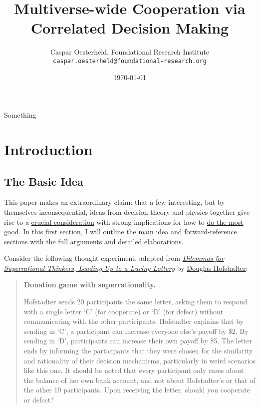 \documentclass{book}
\title{Multiverse-wide Cooperation via Correlated Decision Making}
\author {Caspar Oesterheld, Foundational Research Institute\\\texttt{caspar.oesterheld@foundational-research.org}}
\date{\today}
\begin{document}
Something
\maketitle    %



\newpage

\tableofcontents

\chapter{Introduction}
\label{Introduction}
\section{The Basic Idea}
\label{basicidea}

This paper makes an extraordinary claim: that a few interesting, but by themselves inconsequential, ideas from decision theory and physics together give rise to a \href{https://casparoesterheld.files.wordpress.com/2016/11/crucialconsiderations1.pdf}{crucial consideration} with strong implications for how to \href{https://en.wikipedia.org/wiki/Effective_altruism}{do the most good}. In this first section, I will outline the main idea and forward-reference sections with the full arguments and detailed elaborations.

Consider the following thought experiment, adapted from \href{https://www.gwern.net/docs/1985-hofstadter#dilemmas-for-superrational-thinkers-leading-up-to-a-luring-lottery}{\textit{Dilemmas for Superrational Thinkers, Leading Up to a Luring Lottery}} by \href{https://en.wikipedia.org/wiki/Douglas_Hofstadter}{Douglas Hofstadter}:

\begin{quote}
\hypertarget{donationgame}{\textbf{Donation game with superrationality.}} Hofstadter sends 20 participants the same letter, asking them to respond with a single letter ‘C’ (for cooperate) or ‘D’ (for defect) without communicating with the other participants. Hofstadter explains that by sending in ‘C’, a participant can increase everyone else’s payoff by \$2. By sending in ‘D’, participants can increase their own payoff by \$5. The letter ends by informing the participants that they were chosen for the similarity and rationality of their decision mechanisms, particularly in weird scenarios like this one. It should be noted that every participant only cares about the balance of her own bank account, and not about Hofstadter’s or that of the other 19 participants. Upon receiving the letter, should you cooperate or defect?
\end{quote}
\end{document}
